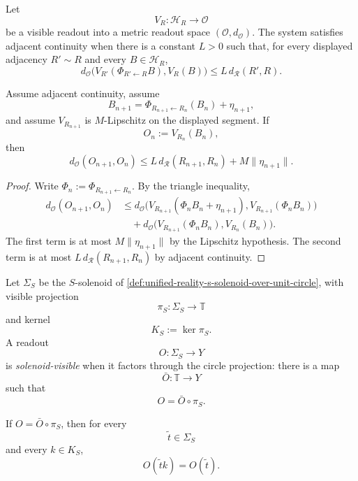 \begin{definition}
\label{def:observer-centered-visible-readout-adjacent-continuity}
Let
$$
V_R:\mathcal H_R\to\mathcal O
$$
be a visible readout into a metric readout space
$(\mathcal O,d_{\mathcal O})$. The system satisfies adjacent continuity
when there is a constant $L>0$ such that, for every displayed adjacency
$R'\sim R$ and every $B\in\mathcal H_R$,
$$
d_{\mathcal O}
\bigl(
V_{R'}(\Phi_{R'\leftarrow R}B),
V_R(B)
\bigr)
\le
L\,d_{\mathcal R}(R',R).
$$
\end{definition}

\begin{theorem}
\label{thm:observer-centered-visible-stability-bound}
Assume adjacent continuity, assume
$$
B_{n+1}
=
\Phi_{R_{n+1}\leftarrow R_n}(B_n)+\eta_{n+1},
$$
and assume $V_{R_{n+1}}$ is $M$-Lipschitz on the displayed segment. If
$$
O_n:=V_{R_n}(B_n),
$$
then
$$
d_{\mathcal O}(O_{n+1},O_n)
\le
L\,d_{\mathcal R}(R_{n+1},R_n)
+
M\|\eta_{n+1}\|.
$$
\end{theorem}

\begin{proof}
Write $\Phi_n:=\Phi_{R_{n+1}\leftarrow R_n}$. By the triangle inequality,
$$
\begin{aligned}
d_{\mathcal O}(O_{n+1},O_n)
&\le
d_{\mathcal O}
\bigl(
V_{R_{n+1}}(\Phi_nB_n+\eta_{n+1}),
V_{R_{n+1}}(\Phi_nB_n)
\bigr)\\
&\quad+
d_{\mathcal O}
\bigl(
V_{R_{n+1}}(\Phi_nB_n),
V_{R_n}(B_n)
\bigr).
\end{aligned}
$$
The first term is at most $M\|\eta_{n+1}\|$ by the Lipschitz hypothesis.
The second term is at most $L\,d_{\mathcal R}(R_{n+1},R_n)$ by adjacent
continuity.
\end{proof}

\begin{definition}
\label{def:observer-centered-solenoid-visible-phase-readout}
Let $\Sigma_S$ be the $S$-solenoid of
\autoref{def:unified-reality-s-solenoid-over-unit-circle}, with visible
projection
$$
\pi_S:\Sigma_S\to\mathbb T
$$
and kernel
$$
K_S:=\ker\pi_S.
$$
A readout
$$
O:\Sigma_S\to Y
$$
is \emph{solenoid-visible} when it factors through the circle projection:
there is a map
$$
\bar O:\mathbb T\to Y
$$
such that
$$
O=\bar O\circ\pi_S.
$$
\end{definition}

\begin{theorem}
\label{thm:observer-centered-solenoid-visible-kernel-blind}
If $O=\bar O\circ\pi_S$, then for every
$$
\widetilde t\in\Sigma_S
$$
and every $k\in K_S$,
$$
O(\widetilde t k)=O(\widetilde t).
$$
\end{theorem}


